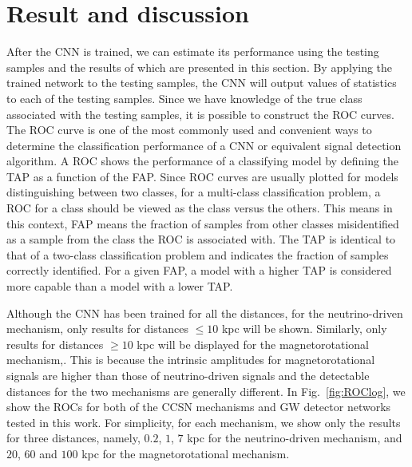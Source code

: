 \documentclass[aps,twocolumn,showpacs,groupedaddress, nofootinbib]{revtex4}  %
\begin{document}
\section{Result and discussion}\label{sec:result}
%
%
After the \ac{CNN} is trained, we can estimate its performance using the
testing samples and the results of which are presented in this section. 
By applying the trained network to the testing samples, 
the \ac{CNN} will output values of statistics to each of the testing samples. 
Since we have knowledge of the true class associated with the testing samples,
it is possible to construct the \ac{ROC} curves.
The \ac{ROC} curve is one of the most commonly used and convenient ways to 
determine the classification performance of a \ac{CNN} or equivalent signal detection 
algorithm. A \ac{ROC} shows the performance of a classifying model by
defining the \ac{TAP} as a function of the \ac{FAP}. Since \ac{ROC} curves are
usually plotted for models distinguishing between two classes, for a
multi-class classification problem, a \ac{ROC} for a class should be viewed as
the class versus the others. This means in this context, \ac{FAP} means the
fraction of samples from other classes misidentified as a sample from the class
the \ac{ROC} is associated with. The \ac{TAP} is identical to that of a
two-class classification problem and indicates the fraction of samples
correctly identified.  For a given \ac{FAP}, a model with a higher \ac{TAP} is
considered more capable than a model with a lower \ac{TAP}.

%
%

Although the \ac{CNN} has been trained for all the distances, 
for the neutrino-driven mechanism, only results for distances $\leq 10$ kpc
will be shown. Similarly, only results for distances $\geq 10$ kpc will be displayed 
for the magnetorotational mechanism,. 
This is because the intrinsic amplitudes for magnetorotational signals are
higher than those of neutrino-driven signals and the detectable distances for the two mechanisms 
are generally different.
In Fig.~\ref{fig:ROClog}, we show the \acp{ROC} for both of the \ac{CCSN}
mechanisms and \ac{GW} detector networks tested in this work. For simplicity,
for each mechanism, we show only the results for three distances, 
namely, $0.2$, $1$, $7$ kpc for the neutrino-driven mechanism, and 
$20$, $60$ and $100$ kpc for the magnetorotational mechanism.
\end{document}

